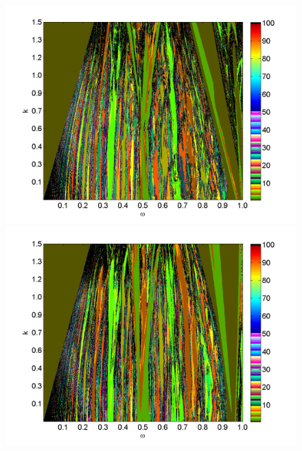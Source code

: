 \begin{figure}[H]
\includegraphics[width=.5\textwidth]{figs/tongues_n_ma_1000_L_0225.png}\hfill
\includegraphics[width=.5\textwidth]{figs/tongues_n_ma_1000_L_025.png}\\
\end{figure}

